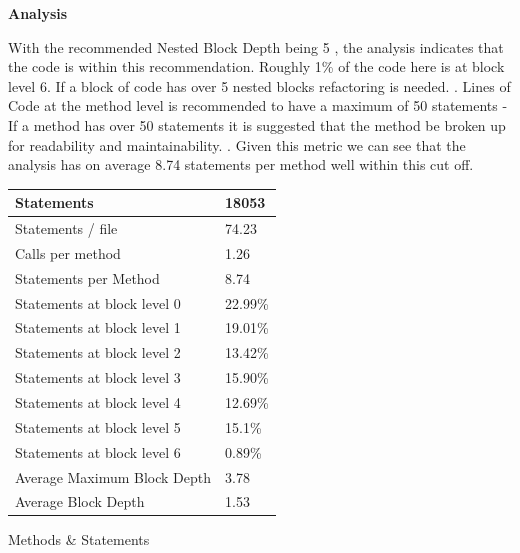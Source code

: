 						
		\begin{multicols}{2}
		
			\vspace{5mm}
			\large{\bfseries{Analysis}}
			\vspace{2mm}
			
			\normalsize
			{				
				With the recommended Nested Block Depth being 5 \citet{Gintenreiter}, the analysis indicates that the code is within this recommendation.
				Roughly 1\% of the code here is at block level 6.  If a block of code has over 5 nested blocks refactoring is needed. \citet{Gintenreiter}.
				\newline
				\newline
				Lines of Code at the method level is recommended to have a maximum of 50 statements - If a method has over 50 statements it is
				suggested that the method be broken up for readability and maintainability. \citet{Gintenreiter}.  Given this metric we can see that the
				analysis has on average 8.74 statements per method well within this cut off.
				\newline
				\newline
			}	
			
			\columnbreak
			
			\begin{tablehere}
				\centering
				\small
				{
					\begin{tabular}{ | l | l |}
																					   \hline
						Statements  						& 18053					\\ \hline	
						Statements / file					& 74.23 				\\ \hline	
						Calls per method 					& 1.26					\\ \hline
						Statements per Method				& 8.74					\\ \hline
						Statements at block level 0			& 22.99\%				\\ \hline
						Statements at block level 1			& 19.01\%				\\ \hline
						Statements at block level 2			& 13.42\%				\\ \hline
						Statements at block level 3			& 15.90\%				\\ \hline
						Statements at block level 4			& 12.69\%				\\ \hline
						Statements at block level 5			& 15.1\%				\\ \hline
						Statements at block level 6			& 0.89\%				\\ \hline
						Average Maximum Block Depth 		& 3.78 					\\ \hline
						Average Block Depth					& 1.53 					\\ \hline
					\end{tabular}
				}
				\caption{Methods \& Statements}
				\label{tab:MetricBreakdown2}
			\end{tablehere}	
			
		\end{multicols}	
		
